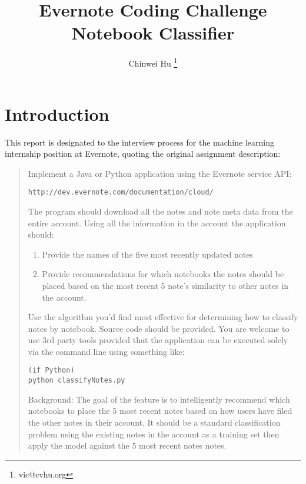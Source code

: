 \documentclass[11pt]{article}
\author{Chinwei Hu \footnote{vic@cvhu.org}
}
\title{\large{Evernote Coding Challenge} \\ \huge{Notebook Classifier}}
\begin{document}
\sloppy

\maketitle


\section{Introduction}

This report is designated to the interview process for the machine learning internship position at Evernote, quoting the original assignment description:
\begin{quotation}
Implement a Java or Python application using the Evernote service API:

\begin{verbatim}
http://dev.evernote.com/documentation/cloud/
\end{verbatim}

The program should download all the notes and note meta data from the entire account. Using all the information in the account the application should:

\begin{enumerate}
\item Provide the names of the five most recently updated notes
\item Provide recommendations for which notebooks the notes should be placed based on the most recent 5 note's similarity to other notes in the account.

\end{enumerate}


Use the algorithm you'd find most effective for determining how to classify notes by notebook. Source code should be provided. You are welcome to use 3rd party tools provided that the application can be executed solely via the command line using something like:

\begin{verbatim}
(if Python)
python classifyNotes.py 
\end{verbatim}

Background: The goal of the feature is to intelligently recommend which notebooks to place the 5 most recent notes based on how users have filed the other notes in their account. It should be a standard classification problem using the existing notes in the account as a training set then apply the model against the 5 most recent notes notes.
\end{quotation}
\end{document}
